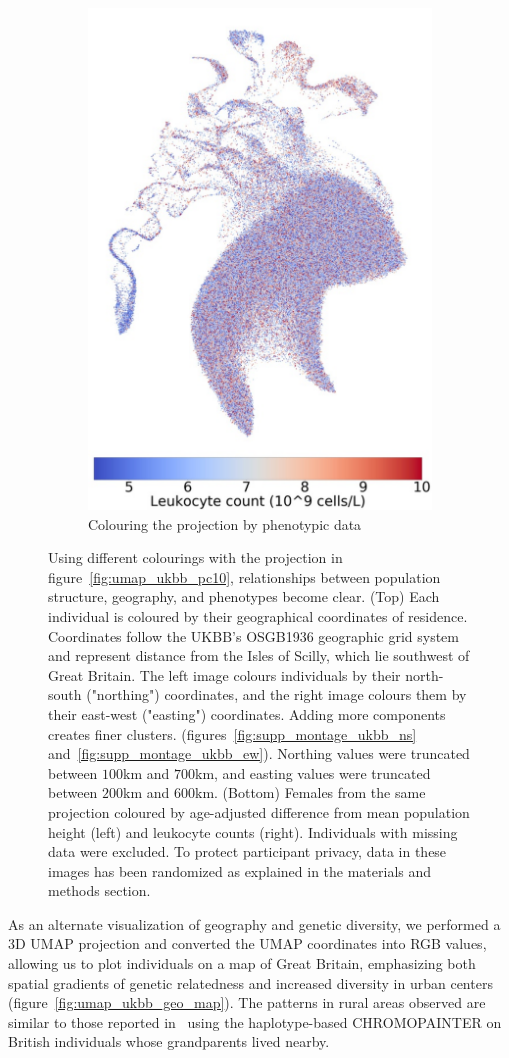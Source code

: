 \documentclass[12pt]{pnas-new}
\begin{document}
\begin{figure}
\begin{subfigure}{\columnwidth}
    \includegraphics[width=.4\columnwidth]{images/UKBB_UMAP_PC10_NN15_MD05_2018328174511_201871416519_leukocyte_count_pct5_f.pdf}
   \caption{Colouring the projection by phenotypic data}
    \label{fig:umap_height_female}
      \end{subfigure}
      \caption{Using different colourings with the projection in figure~\ref{fig:umap_ukbb_pc10}, relationships between population structure, geography, and phenotypes become clear. (Top) Each individual is coloured by their geographical coordinates of residence. Coordinates follow the UKBB's OSGB1936 geographic grid system and represent distance from the Isles of Scilly, which lie southwest of Great Britain. The left image colours individuals by their north-south ("northing") coordinates, and the right image colours them by their east-west ("easting") coordinates. Adding more components creates finer clusters.  (figures~\ref{fig:supp_montage_ukbb_ns} and~\ref{fig:supp_montage_ukbb_ew}). Northing values were truncated between $100$km and $700$km, and easting values were truncated between $200$km and $600$km. (Bottom) Females from the same projection coloured by age-adjusted difference from mean population height (left) and leukocyte counts (right). Individuals with missing data were excluded. To protect participant privacy, data in these images has been randomized as explained in the materials and methods section.}
\end{figure}

As an alternate visualization of geography and genetic diversity, we performed a 3D UMAP projection and converted the UMAP coordinates into RGB values, allowing us to plot individuals on a map of Great Britain, emphasizing both spatial gradients of genetic relatedness and increased diversity in urban centers (figure~\ref{fig:umap_ukbb_geo_map}). The patterns in rural areas observed are similar to those reported in~\cite{leslie2015fine} using the haplotype-based CHROMOPAINTER on British individuals whose grandparents lived nearby.  
\end{document}
